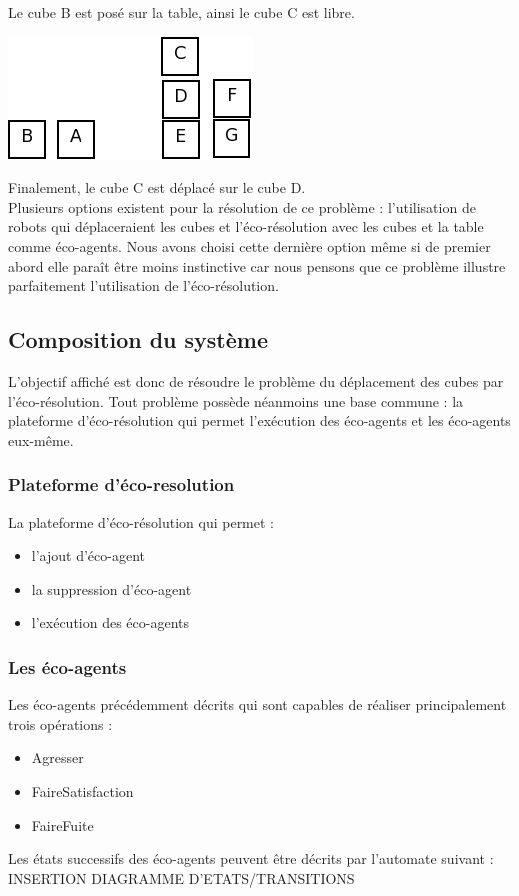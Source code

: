 \documentclass[12pt , a4paper]{article}
\begin{document}
Le cube B est posé sur la table, ainsi le cube C est libre.
\begin{center}
	\includegraphics[scale=0.7]{../Image/4.png}	
\end{center}
Finalement, le cube C est déplacé sur le cube D.\\
Plusieurs options existent pour la résolution de ce problème : l'utilisation de robots qui déplaceraient les cubes et l'éco-résolution avec les cubes et la table comme éco-agents. Nous avons choisi cette dernière option même si de premier abord elle paraît être moins instinctive car nous pensons que ce problème illustre parfaitement l'utilisation de l'éco-résolution.
\subsection{Composition du système}
L'objectif affiché est donc de résoudre le problème du déplacement des cubes par l'éco-résolution. Tout problème possède néanmoins une base commune : la plateforme d'éco-résolution qui permet l'exécution des éco-agents et les éco-agents eux-même. 
\subsubsection{Plateforme d'éco-resolution}
\noindent La plateforme d'éco-résolution qui permet :
\begin{itemize}
\item l'ajout d'éco-agent
\item la suppression d'éco-agent
\item l'exécution des éco-agents
\end{itemize}
\subsubsection{Les éco-agents}
\noindent Les éco-agents précédemment décrits qui sont capables de réaliser principalement trois opérations :
\begin{itemize}
\item Agresser
\item FaireSatisfaction
\item FaireFuite
\end{itemize}
Les états successifs des éco-agents peuvent être décrits par l'automate suivant :
INSERTION DIAGRAMME D'ETATS/TRANSITIONS
\end{document}
